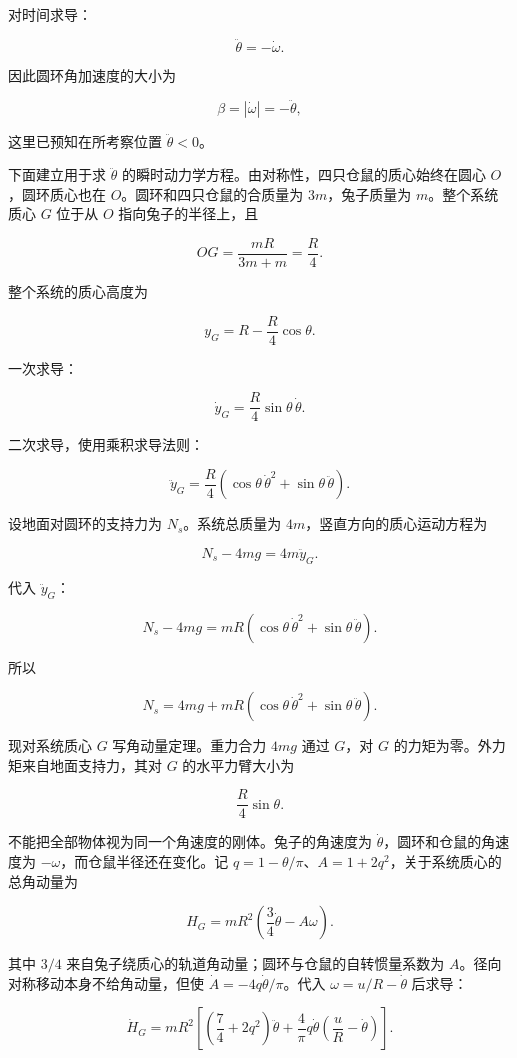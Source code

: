 \documentclass[12pt,a4paper,UTF8]{ctexart}
\begin{document}
对时间求导：

\[\ddot\theta=-\dot\omega.\]

因此圆环角加速度的大小为

\[\beta=|\dot\omega|=-\ddot\theta,\]

这里已预知在所考察位置 \(\ddot\theta<0\)。

下面建立用于求 \(\ddot\theta\)
的瞬时动力学方程。由对称性，四只仓鼠的质心始终在圆心 \(O\)，圆环质心也在
\(O\)。圆环和四只仓鼠的合质量为 \(3m\)，兔子质量为 \(m\)。整个系统质心
\(G\) 位于从 \(O\) 指向兔子的半径上，且

\[OG=\frac{mR}{3m+m}=\frac R4.\]

整个系统的质心高度为

\[y_G=R-\frac R4\cos\theta.\]

一次求导：

\[\dot y_G=\frac R4\sin\theta\,\dot\theta.\]

二次求导，使用乘积求导法则：

\[\ddot y_G=\frac R4
\left(\cos\theta\,\dot\theta^2+\sin\theta\,\ddot\theta\right).\]

设地面对圆环的支持力为 \(N_s\)。系统总质量为
\(4m\)，竖直方向的质心运动方程为

\[N_s-4mg=4m\ddot y_G.\]

代入 \(\ddot y_G\)：

\[N_s-4mg
=mR\left(\cos\theta\,\dot\theta^2+\sin\theta\,\ddot\theta\right).\]

所以

\[N_s=4mg+mR
\left(\cos\theta\,\dot\theta^2+\sin\theta\,\ddot\theta\right).\]

现对系统质心 \(G\) 写角动量定理。重力合力 \(4mg\) 通过 \(G\)，对 \(G\)
的力矩为零。外力矩来自地面支持力，其对 \(G\) 的水平力臂大小为

\[\frac R4\sin\theta.\]

不能把全部物体视为同一个角速度的刚体。兔子的角速度为
\(\dot\theta\)，圆环和仓鼠的角速度为 \(-\omega\)，而仓鼠半径还在变化。记
\(q=1-\theta/\pi\)、\(A=1+2q^2\)，关于系统质心的总角动量为

\[H_G=mR^2\left(\frac34\dot\theta-A\omega\right).\]

其中 \(3/4\) 来自兔子绕质心的轨道角动量；圆环与仓鼠的自转惯量系数为
\(A\)。径向对称移动本身不给角动量，但使
\(\dot A=-4q\dot\theta/\pi\)。代入 \(\omega=u/R-\dot\theta\) 后求导：

\[\dot H_G=mR^2\left[
\left(\frac74+2q^2\right)\ddot\theta
+\frac4\pi q\dot\theta\left(\frac uR-\dot\theta\right)\right].\]
\end{document}
